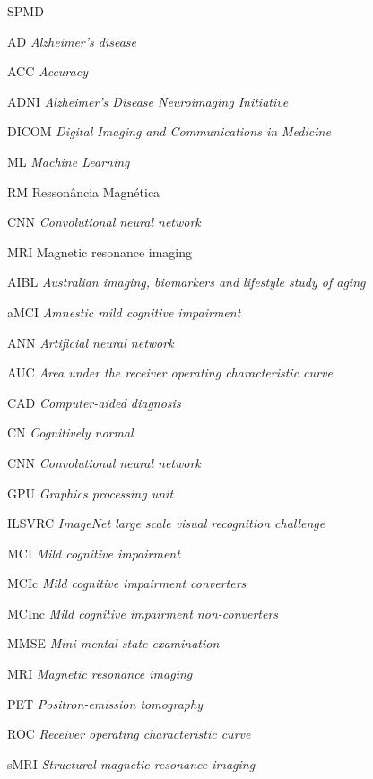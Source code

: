 \documentclass[openright]{UFRGS} %
\begin{document}
\begin{listofabbrv}{SPMD}
        \item[AD]  \textit{Alzheimer’s disease}
        \item[ACC] \textit{Accuracy}
        \item[ADNI ]\textit{Alzheimer’s Disease Neuroimaging Initiative}
        \item[DICOM ]\textit{Digital Imaging and Communications in Medicine}
        \item[ML] \textit{Machine Learning}
        \item[RM] Ressonância Magnética
        \item[CNN] \textit{Convolutional neural network}
        \item[MRI] Magnetic resonance imaging
        \item[AIBL] \textit{Australian imaging, biomarkers and lifestyle study of aging}
        \item[aMCI] \textit{Amnestic mild cognitive impairment}
        \item[ANN]  \textit{Artificial neural network}
        \item[AUC]  \textit{Area under the receiver operating characteristic curve}
        \item[CAD] \textit{Computer-aided diagnosis}
        \item[CN] \textit{Cognitively normal}
        \item[CNN] \textit{Convolutional neural network}
        \item[GPU] \textit{Graphics processing unit}
        \item[ILSVRC] \textit{ImageNet large scale visual recognition challenge}
        \item[MCI] \textit{Mild cognitive impairment}
        \item[MCIc] \textit{Mild cognitive impairment converters}
        \item[MCInc] \textit{Mild cognitive impairment non-converters}
        \item[MMSE] \textit{Mini-mental state examination}
        \item[MRI] \textit{Magnetic resonance imaging}
        \item[PET] \textit{Positron-emission tomography}
        \item[ROC] \textit{Receiver operating characteristic curve}
        \item[sMRI] \textit{Structural magnetic resonance imaging}  
          
          
\end{listofabbrv}
\end{document}
